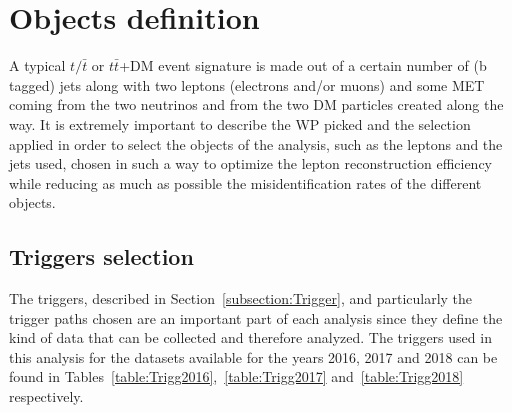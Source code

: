 \documentclass[a4paper, 10pt, openright]{report}
\begin{document}
\section{Objects definition} \label{section:ObjectDef}

A typical $t/\bar t$ or $t \bar t$+DM event signature is made out of a certain number of (b tagged) jets along with two leptons (electrons and/or muons) and some \ac{MET} coming from the two neutrinos and from the two \ac{DM} particles created along the way. It is extremely important to describe the \acf{WP} picked and the selection applied in order to select the objects of the analysis, such as the leptons and the jets used, chosen in such a way to optimize the lepton reconstruction efficiency while reducing as much as possible the misidentification rates of the different objects.


\subsection{Triggers selection} \label{section:Triggers}

The triggers, described in Section~\ref{subsection:Trigger}, and particularly the trigger paths chosen are an important part of each analysis since they define the kind of data that can be collected and therefore analyzed. The triggers used in this analysis for the datasets available for the years 2016, 2017 and 2018 can be found in Tables~\ref{table:Trigg2016},~\ref{table:Trigg2017} and~\ref{table:Trigg2018} respectively.
\end{document}
